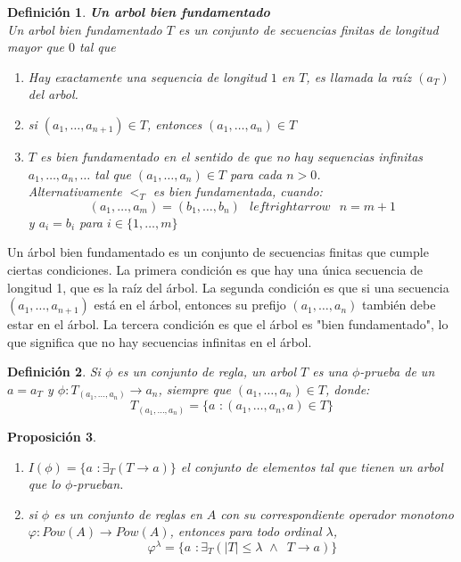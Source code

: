 \documentclass[executivepaper]{article}
\newtheorem{propo}{Proposición}[section]
\newtheorem{defi}[propo]{Definición}
\begin{document}
\begin{defi}\textbf{Un arbol bien fundamentado}\\
    Un arbol bien fundamentado $T$ es un conjunto de secuencias finitas de longitud mayor que $0$ tal que
    \begin{enumerate}
        \item Hay exactamente una sequencia de longitud $1$ en $T$, es llamada la raíz $(a_{T})$ del arbol.
        \item si $(a_1,\ldots,a_{n+1})\in T$, entonces $(a_1,\ldots,a_{n})\in T$
        \item $T$ es bien fundamentado en el sentido de que no hay sequencias infinitas $a_1,\ldots,a_n,\ldots$ tal que $(a_1,\ldots,a_{n})\in T$ para cada $n>0$.\\
        Alternativamente $<_T$ es bien fundamentada, cuando:
        $$(a_1,\ldots,a_{m}) = (b_1,\ldots,b_{n}) \,\,\,\ leftrightarrow \,\,\,\ n = m+1$$
        y $a_i = b_i$ para $i\in\{1,\ldots, m\}$
    \end{enumerate}
\end{defi}
Un árbol bien fundamentado es un conjunto de secuencias finitas que cumple ciertas condiciones. La primera condición es que hay una única secuencia de longitud 1, que es la raíz del árbol. La segunda condición es que si una secuencia $(a_1,\ldots,a_{n+1})$ está en el árbol, entonces su prefijo $(a_1,\ldots,a_n)$ también debe estar en el árbol. La tercera condición es que el árbol es "bien fundamentado", lo que significa que no hay secuencias infinitas en el árbol.

\begin{defi}
    Si $\phi$ es un conjunto de regla, un arbol $T$ es una $\phi$-prueba de un $a = a_T$ y $\phi: T_{(a_1,\ldots,a_{n})}\rightarrow a_n$, siempre que $(a_1,\ldots,a_{n})\in T$, donde:
    $$T_{(a_1,\ldots,a_{n})} = \{a \,\, : (a_1,\ldots,a_{n},a) \in T\}$$
\end{defi}
\begin{propo}
    \begin{enumerate}
        \item $I(\phi) = \{a\,\,:\exists_{T}(T\rightarrow a)\}$ el conjunto de elementos tal que tienen un arbol que lo $\phi$-prueban.
        \item si $\phi$ es un conjunto de reglas en $A$ con su correspondiente operador monotono $\varphi:Pow(A)\rightarrow Pow(A)$, entonces para todo ordinal $\lambda$,
        $$\varphi^{\lambda} = \{a\,\,:\exists_{T}(|T|\leq\lambda\,\,\land\,\,\,T\rightarrow a)\}$$
    \end{enumerate}
\end{propo}
\end{document}
